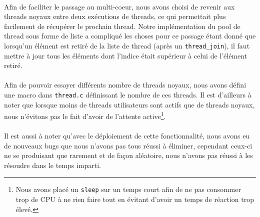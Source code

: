 \documentclass{article}
\begin{document}
        \paragraph{}
        Afin de faciliter le passage au multi-coeur, nous avons choisi
        de revenir aux threads noyaux entre deux exécutions de threads, ce
        qui permettait plus facilement de récupérer le prochain thread. Notre
        implémentation du pool de thread sous forme de liste a compliqué les
        choses pour ce passage étant donné que lorsqu'un élément est retiré
        de la liste de thread (après un \verb!thread_join!), il faut mettre
        à jour tous les éléments dont l'indice était supérieur à celui de
        l'élément retiré.
        \paragraph{}
        Afin de pouvoir essayer différents nombre de threads noyaux, nous
        avons défini une macro dans \verb!thread.c! définissant le nombre
        de ces threads. Il est d'ailleurs à noter que lorsque moins de
        threads utilisateurs sont actifs que de threads noyaux, nous
        n'évitons pas le fait d'avoir de l'attente active\footnote{Nous avons
          placé un \verb!sleep! sur un temps court afin de ne pas consommer
          trop de CPU à ne rien faire tout en évitant d'avoir un temps de
          réaction trop élevé.}.
        \paragraph{}
        Il est aussi à noter qu'avec le déploiement de cette fonctionnalité,
        nous avons eu de nouveaux bugs que nous n'avons pas tous réussi à
        éliminer, cependant ceux-ci ne se produisant que rarement et de façon
        aléatoire, nous n'avons pas réussi à les résoudre dans le temps
        imparti.
\end{document}
